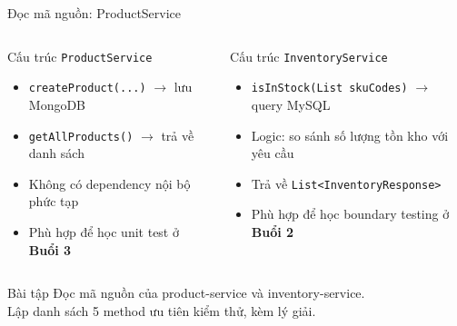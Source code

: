 \documentclass[aspectratio=169,12pt]{beamer}
\begin{document}
\begin{frame}{Đọc mã nguồn: ProductService}
  \begin{columns}
    \begin{block}{Cấu trúc \texttt{ProductService}}
      \begin{itemize}
        \item \texttt{createProduct(...)} $\to$ lưu MongoDB
        \item \texttt{getAllProducts()} $\to$ trả về danh sách
        \item Không có dependency nội bộ phức tạp
        \item Phù hợp để học unit test ở \textbf{Buổi 3}
      \end{itemize}
    \end{block}

    \begin{block}{Cấu trúc \texttt{InventoryService}}
      \begin{itemize}
        \item \texttt{isInStock(List skuCodes)} $\to$ query MySQL
        \item Logic: so sánh số lượng tồn kho với yêu cầu
        \item Trả về \texttt{List<InventoryResponse>}
        \item Phù hợp để học boundary testing ở \textbf{Buổi 2}
      \end{itemize}
    \end{block}
  \end{columns}

  \vspace{0.5em}
  \begin{alertblock}{Bài tập}
    Đọc mã nguồn của product-service và inventory-service.\\
    Lập danh sách 5 method ưu tiên kiểm thử, kèm lý giải.
  \end{alertblock}
\end{frame}
\end{document}
